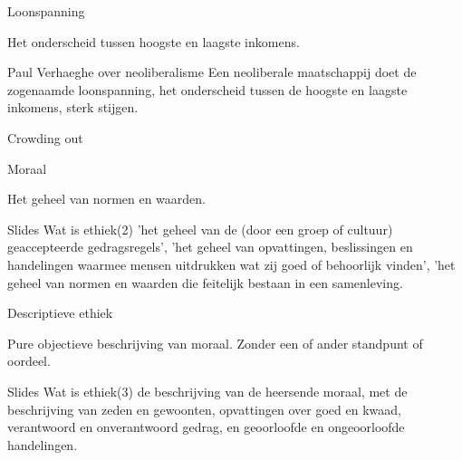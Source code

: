 \documentclass[main.tex]{subfiles}
\begin{document}
\begin{examenvraag}
    \begin{vraag}
        Loonspanning
    \end{vraag}

    \begin{antwoord}
        Het onderscheid tussen hoogste en laagste inkomens.
        \begin{citaat}{Paul Verhaeghe over neoliberalisme}
            Een neoliberale maatschappij doet de zogenaamde loonspanning, het onderscheid tussen de hoogste en laagste inkomens, sterk stijgen.
        \end{citaat}
    \end{antwoord}
\end{examenvraag}


\begin{examenvraag}
    \begin{vraag}
        Crowding out
    \end{vraag}

    \begin{antwoord}

    \end{antwoord}
\end{examenvraag}


\begin{examenvraag}
    \begin{vraag}
        Moraal
    \end{vraag}

    \begin{antwoord}
    	Het geheel van normen en waarden. 
		\begin{citaat}{Slides Wat is ethiek(2)}
			'het geheel van de (door een groep of cultuur) geaccepteerde gedragsregels', 
			'het geheel van opvattingen, beslissingen en handelingen waarmee mensen uitdrukken wat zij goed of behoorlijk vinden',
			'het geheel van normen en waarden die feitelijk bestaan in een samenleving.
		\end{citaat}
    \end{antwoord}
\end{examenvraag}


\begin{examenvraag}
    \begin{vraag}
        Descriptieve ethiek
    \end{vraag}

    \begin{antwoord}
    	Pure objectieve beschrijving van moraal.
    	Zonder een of ander standpunt of oordeel. 
		\begin{citaat}{Slides Wat is ethiek(3)}
			de beschrijving van de heersende moraal, met de beschrijving van zeden en gewoonten, opvattingen over goed en kwaad,
			verantwoord en onverantwoord gedrag, en geoorloofde en ongeoorloofde handelingen.
		\end{citaat}
    \end{antwoord}
\end{examenvraag}
\end{document}
